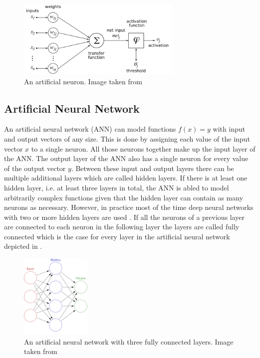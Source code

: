 \begin{figure}[H]
    \centering
    \includegraphics[width=0.7\textwidth]{images/figures/artificial_neuronHOML.png}
    \caption{An artificial neuron. Image taken from \parencite{2005-chrislb-artificial-neuron}}
\end{figure}


\subsection{Artificial Neural Network}

An artificial neural network (ANN) can model functions $f(x) = y$ with input and output vectors of any size.
This is done by assigning each value of the input vector $x$ to a single neuron. All those neurons together make
up the input layer of the ANN. The output layer of the ANN also has a single neuron for every value of the
output vector $y$. Between these input and output layers there can be multiple additional layers which are called
hidden layers. If there is at least one hidden layer, i.e. at least three layers in total, the ANN is abled to 
model arbitrarily complex functions given that the hidden layer can contain as many neurons as necessary.
However, in practice most of the time
deep neural networks with two or more hidden layers are used \parencite{2017-geron-homl}.
If all the neurons of a previous layer are connected to each neuron in the following layer the layers are
called fully connected which is the case for every layer in the artificial neural network depicted
in .

\begin{figure}[ht] 
    \centering
    \includegraphics[width=0.3\textwidth]{images/figures/artificial_neural_network.png}
    \caption{An artificial neural network with three fully connected layers.
    Image taken from \parencite{2013-glosser-ann}} \label{figure_fully_connected_nn}
\end{figure} 

